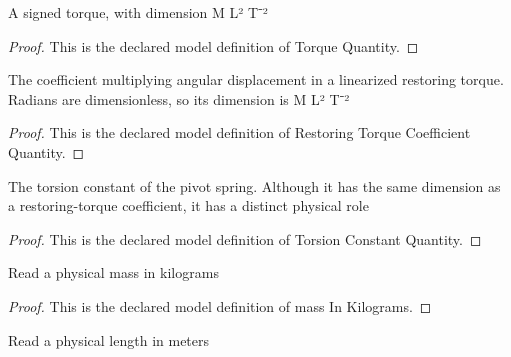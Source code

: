 \begin{definition}
  \label{def:physics:phyx-mini-0270:phyxminiproblems-problemphyxmini0270-torquequantity}
  A signed torque, with dimension M L² T⁻²
\end{definition}
\begin{proof}
  This is the declared model definition of Torque Quantity.
\end{proof}
\begin{definition}
  \label{def:physics:phyx-mini-0270:phyxminiproblems-problemphyxmini0270-restoringtorquecoefficientquantity}
  The coefficient multiplying angular displacement in a linearized restoring torque. Radians are dimensionless, so its dimension is M L² T⁻²
\end{definition}
\begin{proof}
  This is the declared model definition of Restoring Torque Coefficient Quantity.
\end{proof}
\begin{definition}
  \label{def:physics:phyx-mini-0270:phyxminiproblems-problemphyxmini0270-torsionconstantquantity}
  The torsion constant of the pivot spring. Although it has the same dimension as a restoring-torque coefficient, it has a distinct physical role
\end{definition}
\begin{proof}
  This is the declared model definition of Torsion Constant Quantity.
\end{proof}
\begin{definition}
  \label{def:physics:phyx-mini-0270:phyxminiproblems-problemphyxmini0270-massinkilograms}
  Read a physical mass in kilograms
\end{definition}
\begin{proof}
  This is the declared model definition of mass In Kilograms.
\end{proof}
\begin{definition}
  \label{def:physics:phyx-mini-0270:phyxminiproblems-problemphyxmini0270-lengthinmeters}
  Read a physical length in meters
\end{definition}
